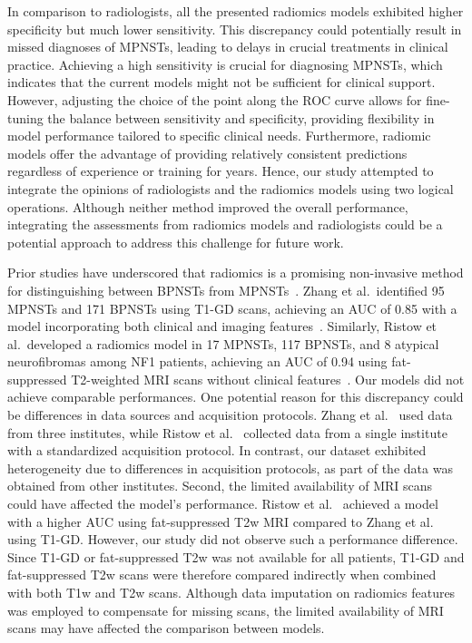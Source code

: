In comparison to radiologists, all the presented radiomics models exhibited higher specificity but much lower sensitivity.
This discrepancy could potentially result in missed diagnoses of MPNSTs, leading to delays in crucial treatments in clinical practice.
Achieving a high sensitivity is crucial for diagnosing MPNSTs, which indicates that the current models might not be sufficient for clinical support.
However, adjusting the choice of the point along the ROC curve allows for fine-tuning the balance between sensitivity and specificity, providing flexibility in model performance tailored to specific clinical needs.
Furthermore, radiomic models offer the advantage of providing relatively consistent predictions regardless of experience or training for years.
Hence, our study attempted to integrate the opinions of radiologists and the radiomics models using two logical operations.
Although neither method improved the overall performance, integrating the assessments from radiomics models and radiologists could be a potential approach to address this challenge for future work.

Prior studies have underscored that radiomics is a promising non-invasive method for distinguishing between BPNSTs from MPNSTs~\autocite{zhang2021,ristow2022}.
Zhang et al.\ identified 95 MPNSTs and 171 BPNSTs using T1-GD scans, achieving an AUC of 0.85 with a model incorporating both clinical and imaging features~\autocite{zhang2021}.
Similarly, Ristow et al.\ developed a radiomics model in 17 MPNSTs, 117 BPNSTs, and 8 atypical neurofibromas among NF1 patients, achieving an AUC of 0.94 using fat-suppressed T2-weighted MRI scans without clinical features~\autocite{ristow2022}.
Our models did not achieve comparable performances.
One potential reason for this discrepancy could be differences in data sources and acquisition protocols.
Zhang et al.~\autocite{zhang2021} used data from three institutes, while Ristow et al.~\autocite{ristow2022} collected data from a single institute with a standardized acquisition protocol.
In contrast, our dataset exhibited heterogeneity due to differences in acquisition protocols, as part of the data was obtained from other institutes.
Second, the limited availability of MRI scans could have affected the model's performance.
Ristow et al.~\autocite{ristow2022} achieved a model with a higher AUC using fat-suppressed T2w MRI compared to Zhang et al.~\autocite{zhang2021} using T1-GD.
However, our study did not observe such a performance difference.
Since T1-GD or fat-suppressed T2w was not available for all patients, T1-GD and fat-suppressed T2w scans were therefore compared indirectly when combined with both T1w and T2w scans.
Although data imputation on radiomics features was employed to compensate for missing scans, the limited availability of MRI scans may have affected the comparison between models.

